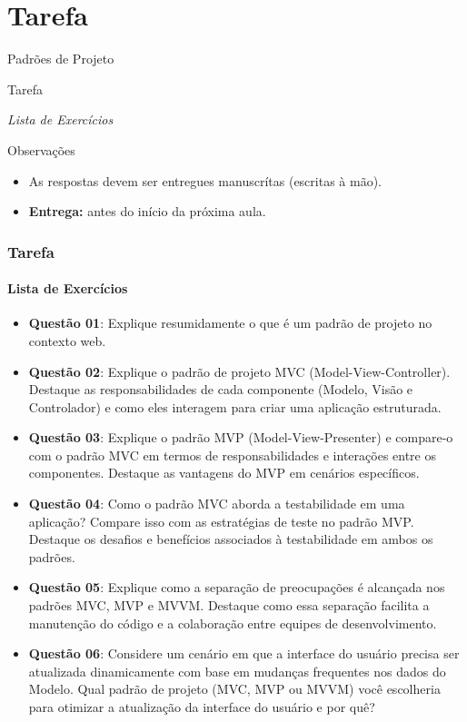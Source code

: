 \documentclass[
	9pt, %
	t, %
]{beamer}
\begin{document}
\section{Tarefa}

\begin{frame}
	\begin{center}
		
		\bigskip\bigskip\bigskip\bigskip %
		{\Large Padrões de Projeto}
		
		\bigskip\bigskip %
		{\Huge Tarefa}
		
		\smallskip
		{\small \textit{Lista de Exercícios}}

		\bigskip\bigskip
		\begin{block}{Observações}
			\begin{itemize}
				\item As respostas devem ser entregues manuscrítas (escritas à mão).
				\item \textbf{Entrega:} antes do início da próxima aula.
			\end{itemize}
		\end{block}
	\end{center}

\end{frame}

\begin{frame}
	\frametitle{Tarefa}
	\framesubtitle{Lista de Exercícios}
	
	\begin{itemize}
		\item { \small \textbf{Questão 01}: Explique resumidamente o que é um padrão de projeto no contexto web. }
		\item { \small \textbf{Questão 02}: Explique o padrão de projeto MVC (Model-View-Controller). Destaque as responsabilidades de cada componente (Modelo, Visão e Controlador) e como eles interagem para criar uma aplicação estruturada. }
		\item { \small \textbf{Questão 03}: Explique o padrão MVP (Model-View-Presenter) e compare-o com o padrão MVC em termos de responsabilidades e interações entre os componentes. Destaque as vantagens do MVP em cenários específicos. }
		\item { \small \textbf{Questão 04}: Como o padrão MVC aborda a testabilidade em uma aplicação? Compare isso com as estratégias de teste no padrão MVP. Destaque os desafios e benefícios associados à testabilidade em ambos os padrões. }
		\item { \small \textbf{Questão 05}: Explique como a separação de preocupações é alcançada nos padrões MVC, MVP e MVVM. Destaque como essa separação facilita a manutenção do código e a colaboração entre equipes de desenvolvimento. }
		\item { \small \textbf{Questão 06}: Considere um cenário em que a interface do usuário precisa ser atualizada dinamicamente com base em mudanças frequentes nos dados do Modelo. Qual padrão de projeto (MVC, MVP ou MVVM) você escolheria para otimizar a atualização da interface do usuário e por quê? }
	\end{itemize}
	
\end{frame}
\end{document}
